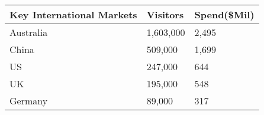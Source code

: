 \begin{tabular}[t]{|p{4cm}|p{2cm}|p{1.3cm}|}
  \hline
Key International Markets & Visitors & Spend(\$Mil) \\ 
  \hline
Australia & 1,603,000 & 2,495 \\ 
  China &   509,000 & 1,699 \\ 
  US &   247,000 &   644 \\ 
  UK &   195,000 &   548 \\ 
  Germany &    89,000 &   317 \\ 
   \hline
\end{tabular}
